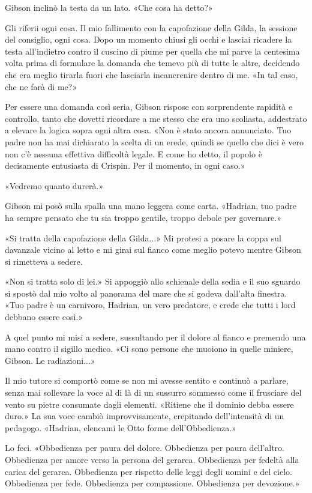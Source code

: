 Gibson inclinò la testa da un lato. «Che cosa ha detto?»

Gli riferii ogni cosa. Il mio fallimento con la capofazione della Gilda,
la sessione del consiglio, ogni cosa. Dopo un momento chiusi gli occhi e
lasciai ricadere la testa all'indietro contro il cuscino di piume per
quella che mi parve la centesima volta prima di formulare la domanda che
temevo più di tutte le altre, decidendo che era meglio tirarla fuori che
lasciarla incancrenire dentro di me. «In tal caso, che ne farà di me?»

Per essere una domanda così seria, Gibson rispose con sorprendente
rapidità e controllo, tanto che dovetti ricordare a me stesso che era
uno scoliasta, addestrato a elevare la logica sopra ogni altra cosa.
«Non è stato ancora annunciato. Tuo padre non ha mai dichiarato la
scelta di un erede, quindi se quello che dici è vero non c'è nessuna
effettiva difficoltà legale. E come ho detto, il popolo è decisamente
entusiasta di Crispin. Per il momento, in ogni caso.»

«Vedremo quanto durerà.»

Gibson mi posò sulla spalla una mano leggera come carta. «Hadrian, tuo
padre ha sempre pensato che tu sia troppo gentile, troppo debole per
governare.»

«Si tratta della capofazione della Gilda...» Mi protesi a posare la
coppa sul davanzale vicino al letto e mi girai sul fianco come meglio
potevo mentre Gibson si rimetteva a sedere.

«Non si tratta solo di lei.» Si appoggiò allo schienale della sedia e il
suo sguardo si spostò dal mio volto al panorama del mare che si godeva
dall'alta finestra. «Tuo padre è un carnivoro, Hadrian, un vero
predatore, e crede che tutti i lord debbano essere così.»

A quel punto mi misi a sedere, sussultando per il dolore al fianco e
premendo una mano contro il sigillo medico. «Ci sono persone che muoiono
in quelle miniere, Gibson. Le radiazioni...»

Il mio tutore si comportò come se non mi avesse sentito e continuò a
parlare, senza mai sollevare la voce al di là di un sussurro sommesso
come il frusciare del vento su pietre consumate dagli elementi. «Ritiene
che il dominio debba essere duro.» La sua voce cambiò improvvisamente,
crepitando dell'intensità di un pedagogo. «Hadrian, elencami le Otto
forme dell'Obbedienza.»

Lo feci.
«\label{fileintero-10.xhtml__idTextAnchor000}{}Obbedienza
per paura del dolore. Obbedienza per paura dell'altro. Obbedienza per
amore verso la persona del gerarca. Obbedienza per fedeltà alla carica
del gerarca. Obbedienza per rispetto delle leggi degli uomini e del
cielo. Obbedienza per fede. Obbedienza per compassione. Obbedienza per
devozione.»

